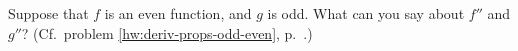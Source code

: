 Suppose that $f$ is an even function, and $g$ is odd.
What can you say about $f''$ and $g''$? (Cf.~problem \ref{hw:deriv-props-odd-even},
p.~\pageref{hw:deriv-props-odd-even}.)
